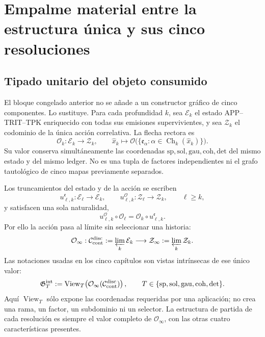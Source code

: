 \chapter{Empalme material entre la estructura única y sus cinco resoluciones}
\label{chap:pdf2-generacion-simultanea-hmt}

\begingroup
\footnotesize

\endgroup

\section{Tipado unitario del objeto consumido}

El bloque congelado anterior no se añade a un constructor gráfico de cinco
componentes. Lo sustituye. Para cada profundidad \(k\), sea
\(\mathcal E_k\) el estado APP--TRIT--TPK enriquecido con todas sus emisiones
supervivientes, y sea \(\mathcal Z_k\) el codominio de la única acción
correlativa. La flecha rectora es
\begin{equation}\label{eq:pdf2-constructor-unico-operaciones}
 \mathcal O_k:\mathcal E_k\longrightarrow\mathcal Z_k,
 \qquad
 \widehat x_k\longmapsto
 \mathcal O\bigl(\{\mathfrak e_\alpha:
 \alpha\in\operatorname{Ch}_k(\widehat x_k)\}\bigr).
\end{equation}
Su valor conserva simultáneamente las coordenadas
\(\mathrm{sp},\mathrm{sol},\mathrm{gau},\mathrm{coh},\mathrm{det}\)
del mismo estado y del mismo ledger. No es una tupla de factores
independientes ni el grafo tautológico de cinco mapas previamente separados.

Los truncamientos del estado y de la acción se escriben
\[
 u^{\mathfrak e}_{\ell,k}:\mathcal E_\ell\to\mathcal E_k,
 \qquad
 u^{\mathcal O}_{\ell,k}:\mathcal Z_\ell\to\mathcal Z_k,
 \qquad \ell\ge k,
\]
y satisfacen una sola naturalidad,
\begin{equation}\label{eq:pdf2-naturalidad-accion-unica}
 u^{\mathcal O}_{\ell,k}\circ\mathcal O_\ell
 =\mathcal O_k\circ u^{\mathfrak e}_{\ell,k}.
\end{equation}
Por ello la acción pasa al límite sin seleccionar una historia:
\[
 \mathcal O_\infty:
 \mathcal C_{\rm cont}^{\rm disc}:=\varprojlim_k\mathcal E_k
 \longrightarrow
 \mathcal Z_\infty:=\varprojlim_k\mathcal Z_k.
\]
Las notaciones usadas en los cinco capítulos son vistas intrínsecas de ese
único valor:
\begin{equation}\label{eq:pdf2-operacion-infinita-tipificada}
 \mathfrak G_T^{\rm int}
 :=\operatorname{View}_T\!\left(
 \mathcal O_\infty(\mathcal C_{\rm cont}^{\rm disc})\right),
 \qquad
 T\in\{\mathrm{sp},\mathrm{sol},\mathrm{gau},\mathrm{coh},\mathrm{det}\}.
\end{equation}
Aquí \(\operatorname{View}_T\) sólo expone las coordenadas requeridas por una
aplicación; no crea una rama, un factor, un subdominio ni un selector. La
estructura de partida de cada resolución es siempre el valor completo de
\(\mathcal O_\infty\), con las otras cuatro características presentes.

